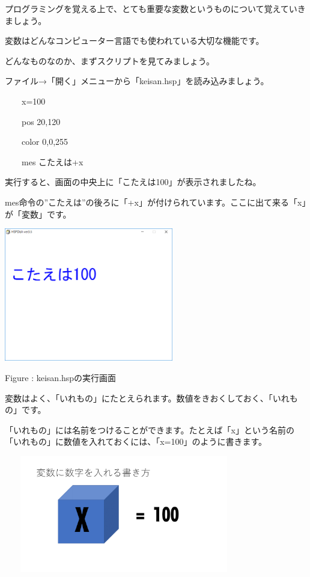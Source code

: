 \documentclass[a4paper,12pt]{jarticle}
\newcounter{Figure}
\renewcommand\theFigure{\arabic{Figure}}
\begin{document}
プログラミングを覚える上で、とても重要な変数というものについて覚えていきましょう。

変数はどんなコンピューター言語でも使われている大切な機能です。

どんなものなのか、まずスクリプトを見てみましょう。

ファイル→「開く」メニューから「keisan.hsp」を読み込みましょう。


\bigskip

\ \ \ \ x=100

\ \ \ \ pos 20,120

\ \ \ \ color 0,0,255

\ \ \ \ mes {\textquotedbl}こたえは{\textquotedbl}+x


\bigskip

実行すると、画面の中央上に「こたえは100」が表示されましたね。

mes命令の”こたえは”の後ろに「+x」が付けられています。ここに出て来る「x」が「変数」です。

\bigskip
\bigskip

\begin{minipage}{9.781cm}
\centering
{\upshape
\includegraphics[keepaspectratio,width=7.382cm,height=5.831cm]{text02-img/text02-img044.png}
\flushleft

Figure \stepcounter{Figure}{\theFigure}: keisan.hspの実行画面}
\end{minipage}

\bigskip
\bigskip
\bigskip

変数はよく、「いれもの」にたとえられます。数値をきおくしておく、「いれもの」です。

「いれもの」には名前をつけることができます。たとえば「x」という名前の「いれもの」に数値を入れておくには、「x=100」のように書きます。

\bigskip
\bigskip

\begin{minipage}{9.781cm}
\centering
{\upshape
\includegraphics[keepaspectratio,width=10.478cm,height=5.106cm]{text02-img/text02-img045.png}}
\end{minipage}
\end{document}
